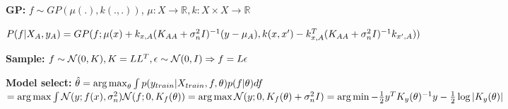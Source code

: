 \textbf{GP:} $f \sim GP(\mu(.), k(.,.))$, $\mu: X \rightarrow \mathbb{R}, k: X\times X \rightarrow \mathbb{R}$\\
\begin{comment}
	\textbf{Definition:} A set of (infinitely) many random variables, using a finite subset indexed by a set X.\\
	\textbf{Definition 2:} A set of variables are a GP, if and only if any marginalized set of random variables is a multivariate Gaussian.\\
	We need to make sure that we are consistent in this infinite set, that's why we have a mean function and covariance function, both encode assumptions about the prior. By having each function a Gaussian, we can combine the means/variances of the single random variables.\\
\end{comment}

$P(f|X_A,y_A) = GP(f; 
\mu(x) + k_{x,A}(K_{AA} + \sigma_n^2 I)^{-1}(y - \mu_A),\\
k(x,x') - k_{x,A}^T(K_{AA} + \sigma_n^2 I)^{-1} k_{x',A}))$\\
\begin{comment}
	\textbf{Cost:} Size of $K_{AA}$ is $|X_A|\times |X_A|$, cost of inversion $O(|X_A|^3)$. 
	$k_{x',X_A}$ is a $|X_A|$ vector, evaluating x' against all elements from $X_A$.\\
	\textbf{Speed-up:} Kernels with distance notion can just use nearby points, treat the rest as independent.\\
\end{comment}

\textbf{Sample:} $f \sim \mathcal{N}(0,K), K=LL^T, \epsilon \sim \mathcal{N}(0,I) \Rightarrow f = L\epsilon$\\
\begin{comment}
	We don't sample f directly, we sample from a marginal distribution that is finite and Gaussian.\\
\end{comment}

\textbf{Model select:} $\hat{\theta} = \operatorname*{arg\,max}_\theta \int p(y_{train} | X_{train}, f, \theta) p(f | \theta) df$\\
$= \operatorname*{arg\,max} \int \mathcal{N}(y; f(x), \sigma_n^2) \mathcal{N}(f; 0, K_f(\theta))
= \operatorname*{arg\,max} \\ \mathcal{N}(y; 0, K_f(\theta) + \sigma_n^2 I)
= \operatorname*{arg\,min} -\frac{1}{2}y^T K_y(\theta)^{-1}y - \frac{1}{2} \log |K_y(\theta)|$\\
\begin{comment}
	\textbf{Intuition:} We average over all possible functions, that means that the model must balance out fitting the data (likelihood) and obeying the prior (prior).\\
	\textbf{CV:} In cross-validation, we find the parameters that fit best for one particular case, which can lead to overfitting more quickly.\\
	The parameters are often $[\sigma_p, \sigma_n, h]$.\\
\end{comment}

